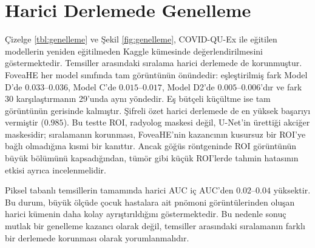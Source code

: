 \section{Harici Derlemede Genelleme}\label{sec:res:generalization}

Çizelge \ref{tbl:genelleme} ve Şekil \ref{fig:genelleme}, COVID-QU-Ex ile eğitilen modellerin yeniden eğitilmeden Kaggle kümesinde değerlendirilmesini göstermektedir. Temsiller arasındaki sıralama harici derlemede de korunmuştur. FoveaHE her model sınıfında tam görüntünün önündedir: eşleştirilmiş fark Model D'de $0.033$--$0.036$, Model C'de $0.015$--$0.017$, Model D2'de $0.005$--$0.006$'dır ve fark 30 karşılaştırmanın 29'unda aynı yöndedir. Eş bütçeli küçültme ise tam görüntünün gerisinde kalmıştır. Şifreli özet harici derlemede de en yüksek başarıyı vermiştir ($0.985$). Bu testte ROI, radyolog maskesi değil, U-Net'in ürettiği akciğer maskesidir; sıralamanın korunması, FoveaHE'nin kazancının kusursuz bir ROI'ye bağlı olmadığına kısmi bir kanıttır. Ancak göğüs röntgeninde ROI görüntünün büyük bölümünü kapsadığından, tümör gibi küçük ROI'lerde tahmin hatasının etkisi ayrıca incelenmelidir.

Piksel tabanlı temsillerin tamamında harici AUC iç AUC'den $0.02$--$0.04$ yüksektir. Bu durum, büyük ölçüde çocuk hastalara ait pnömoni görüntülerinden oluşan harici kümenin daha kolay ayrıştırıldığını göstermektedir. Bu nedenle sonuç mutlak bir genelleme kazancı olarak değil, temsiller arasındaki sıralamanın farklı bir derlemede korunması olarak yorumlanmalıdır.

